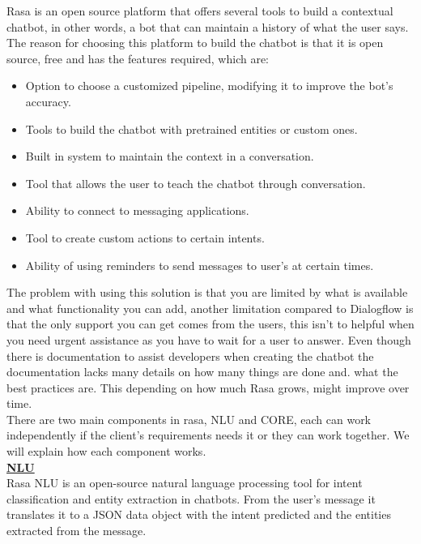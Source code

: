 Rasa is an open source platform that offers several tools to build a contextual chatbot, in other words, a bot that can maintain a history of what the user says.\\
The reason for choosing this platform to build the chatbot is that it is open source, free and has the features required, which are:

\begin{itemize}
	\item Option to choose a customized pipeline, modifying it to improve the bot’s accuracy.
	\item Tools to build the chatbot with pretrained entities or custom ones.
	\item Built in system to maintain the context in a conversation.
	\item Tool that allows the user to teach the chatbot through conversation.
	\item Ability to connect to messaging applications.
	\item Tool to create custom actions to certain intents.
	\item Ability of using reminders to send messages to user’s at certain times.
\end{itemize}
	
The problem with using this solution is that you are limited by what is available and what functionality you can add, another limitation compared to Dialogflow is that the only support you can get comes from the users, this isn’t to helpful when you need urgent assistance as you have to wait for a user to answer. Even though there is documentation to assist developers when creating the chatbot the documentation lacks many details on how many things are done and. what the best practices are. This depending on how much Rasa grows, might improve over time.\\
There are two main components in rasa, NLU and CORE, each can work independently if the client’s requirements needs it or they can work together. We will explain how each component works.\cite{rasa}\\

\textbf{\underline{NLU}}\\

Rasa NLU is an open-source natural language processing tool for intent classification and entity extraction in chatbots.  From the user’s message it translates it to a JSON data object with the intent predicted and the entities extracted from the message.\\

